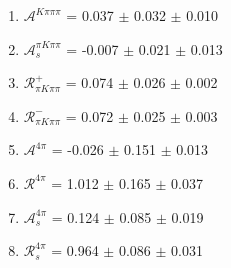 \begin{enumerate}
\item $\mathcal{A}^{K\pi\pi\pi}$ = 0.037 $\pm$ 0.032 $\pm$ 0.010
\item $\mathcal{A}_s^{\pi K\pi\pi}$ = -0.007 $\pm$ 0.021 $\pm$ 0.013
\item $\mathcal{R}_{\pi K\pi\pi}^+$ = 0.074 $\pm$ 0.026 $\pm$ 0.002
\item $\mathcal{R}_{\pi K\pi\pi}^-$ = 0.072 $\pm$ 0.025 $\pm$ 0.003
\item $\mathcal{A}^{4\pi}$ = -0.026 $\pm$ 0.151 $\pm$ 0.013
\item $\mathcal{R}^{4\pi}$ = 1.012 $\pm$ 0.165 $\pm$ 0.037
\item $\mathcal{A}_s^{4\pi}$ = 0.124 $\pm$ 0.085 $\pm$ 0.019
\item $\mathcal{R}_{s}^{4\pi}$ = 0.964 $\pm$ 0.086 $\pm$ 0.031
\end{enumerate}
